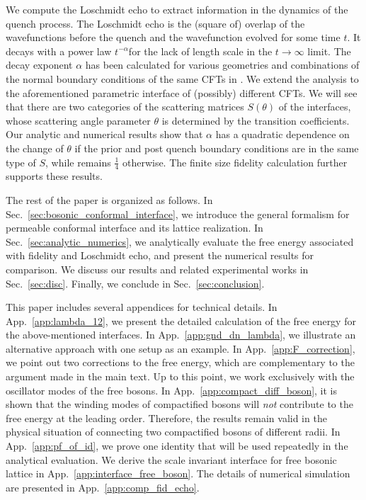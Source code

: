 We compute the Loschmidt echo to extract information in the dynamics of the quench process. The Loschmidt echo is the (square of) overlap of the wavefunctions before the quench and the wavefunction evolved for some time $t$. It decays with a power law $t^{- \alpha}$for the lack of length scale in the $t \rightarrow \infty$ limit. The decay exponent $\alpha$ has been calculated for various geometries and combinations of the normal boundary conditions of the same CFTs in . We extend the analysis to the aforementioned parametric interface of (possibly) different CFTs. We will see that there are two categories of the scattering matrices $S(\theta)$ of the interfaces, whose scattering angle parameter $\theta$ is determined by the transition coefficients. Our analytic and numerical results show that $\alpha$ has a quadratic dependence on the change of $\theta$ if the prior and post quench boundary conditions are in the same type of $S$, while remains $\frac{1}{4}$ otherwise. The finite size fidelity calculation further supports these results. 

The rest of the paper is organized as follows. In Sec.~\ref{sec:bosonic_conformal_interface}, we introduce the general formalism for permeable conformal interface and its lattice realization. In Sec.~\ref{sec:analytic_numerics}, we analytically evaluate the free energy associated with fidelity and Loschmidt echo, and present the numerical results for comparison. We discuss our results and related experimental works in Sec.~\ref{sec:disc}. Finally, we conclude in Sec.~\ref{sec:conclusion}. 

This paper includes several appendices for technical details. In App.~\ref{app:lambda_12}, we present the detailed calculation of the free energy for the above-mentioned interfaces. In App.~\ref{app:gnd_dn_lambda}, we illustrate an alternative approach with one setup as an example. In App.~\ref{app:F_correction}, we point out two corrections to the free energy, which are complementary to the argument made in the main text. Up to this point, we work exclusively with the oscillator modes of the free bosons. In App.~\ref{app:compact_diff_boson}, it is shown that the winding modes of compactified bosons will \emph{not} contribute to the free energy at the leading order. Therefore, the results remain valid in the physical situation of connecting two compactified bosons of different radii. In App.~\ref{app:pf_of_id}, we prove one identity that will be used repeatedly in the analytical evaluation. We derive the scale invariant interface for free bosonic lattice in App.~\ref{app:interface_free_boson}. The details of numerical simulation are presented in App.~\ref{app:comp_fid_echo}.  

